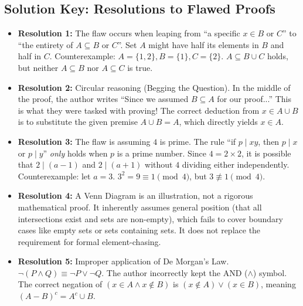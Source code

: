 \documentclass[11pt]{article}
\begin{document}
\subsection*{Solution Key: Resolutions to Flawed Proofs}
\begin{itemize}
    \item \textbf{Resolution 1:} The flaw occurs when leaping from ``a specific $x \in B$ or $C$'' to ``the entirety of $A \subseteq B$ or $C$''. Set $A$ might have half its elements in $B$ and half in $C$. Counterexample: $A = \{1, 2\}, B = \{1\}, C = \{2\}$. $A \subseteq B \cup C$ holds, but neither $A \subseteq B$ nor $A \subseteq C$ is true.
    \item \textbf{Resolution 2:} Circular reasoning (Begging the Question). In the middle of the proof, the author writes ``Since we assumed $B \subseteq A$ for our proof...'' This is what they were tasked with proving! The correct deduction from $x \in A \cup B$ is to substitute the given premise $A \cup B = A$, which directly yields $x \in A$.
    \item \textbf{Resolution 3:} The flaw is assuming $4$ is prime. The rule ``if $p \mid xy$, then $p \mid x$ or $p \mid y$'' \textit{only} holds when $p$ is a prime number. Since $4 = 2 \times 2$, it is possible that $2 \mid (a-1)$ and $2 \mid (a+1)$ without $4$ dividing either independently. Counterexample: let $a = 3$. $3^2 = 9 \equiv 1 \pmod 4$, but $3 \not\equiv 1 \pmod 4$.
    \item \textbf{Resolution 4:} A Venn Diagram is an illustration, not a rigorous mathematical proof. It inherently assumes general position (that all intersections exist and sets are non-empty), which fails to cover boundary cases like empty sets or sets containing sets. It does not replace the requirement for formal element-chasing. 
    \item \textbf{Resolution 5:} Improper application of De Morgan's Law. $\neg(P \land Q) \equiv \neg P \lor \neg Q$. The author incorrectly kept the AND ($\land$) symbol. The correct negation of $(x \in A \land x \notin B)$ is $(x \notin A) \lor (x \in B)$, meaning $(A - B)^c = A^c \cup B$. 
\end{itemize}
\end{document}

